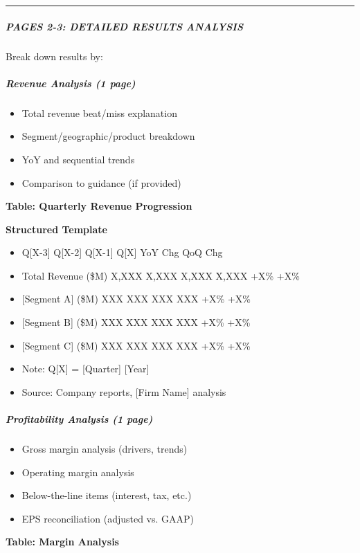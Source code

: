 \documentclass[11pt]{article}
\begin{document}
\vspace{0.5em}\hrule\vspace{0.5em}

\subparagraph{PAGES 2-3: DETAILED RESULTS ANALYSIS}\mbox{}\par

Break down results by:


\subparagraph{Revenue Analysis (1 page)}\mbox{}\par
\begin{itemize}[leftmargin=*,itemsep=2pt,topsep=2pt]
\item {} Total revenue beat/miss explanation
\item {} Segment/geographic/product breakdown
\item {} YoY and sequential trends
\item {} Comparison to guidance (if provided)
\end{itemize}

\textbf{Table: Quarterly Revenue Progression}

\textbf{Structured Template}
\begin{itemize}[leftmargin=*,itemsep=2pt,topsep=2pt]
\item {} Q[X-3] Q[X-2] Q[X-1] Q[X] YoY Chg QoQ Chg
\item {} Total Revenue (\$M) X,XXX X,XXX X,XXX X,XXX +X\% +X\%
\item {} [Segment A] (\$M) XXX XXX XXX XXX +X\% +X\%
\item {} [Segment B] (\$M) XXX XXX XXX XXX +X\% +X\%
\item {} [Segment C] (\$M) XXX XXX XXX XXX +X\% +X\%
\item {} Note: Q[X] = [Quarter] [Year]
\item {} Source: Company reports, [Firm Name] analysis
\end{itemize}

\subparagraph{Profitability Analysis (1 page)}\mbox{}\par
\begin{itemize}[leftmargin=*,itemsep=2pt,topsep=2pt]
\item {} Gross margin analysis (drivers, trends)
\item {} Operating margin analysis
\item {} Below-the-line items (interest, tax, etc.)
\item {} EPS reconciliation (adjusted vs. GAAP)
\end{itemize}

\textbf{Table: Margin Analysis}
\end{document}
